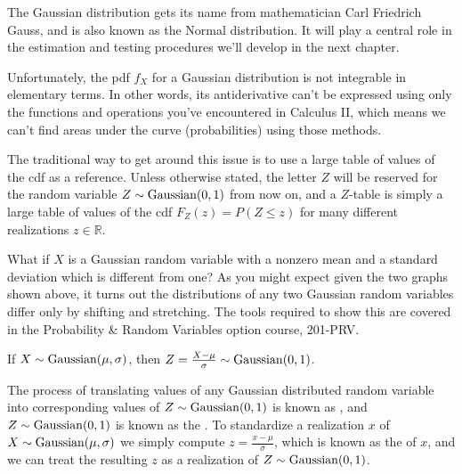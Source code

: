 The Gaussian distribution gets its name from mathematician Carl Friedrich Gauss, and is also known as the Normal distribution. It will play a central role in the estimation and testing procedures we'll develop in the next chapter. 

Unfortunately, the pdf $f_X$ for a Gaussian distribution is not integrable in elementary terms. In other words, its antiderivative can't be expressed using only the functions and operations you've encountered in Calculus II, which means we can't find areas under the curve (probabilities) using those methods.

The traditional way to get around this issue is to use a large table of values of the cdf as a reference. Unless otherwise stated, the letter $Z$ will be reserved for the random variable $Z \sim \operatorname{Gaussian}(0,1)$ from now on, and a $Z$-table is simply a large table of values of the cdf $F_Z(z) = P(Z \leq z)$ for many different realizations $z \in \mathbb{R}$.

What if $X$ is a Gaussian random variable with a nonzero mean and a standard deviation which is different from one? As you might expect given the two graphs shown above, it turns out the distributions of any two Gaussian random variables differ only by shifting and stretching. The tools required to show this are covered in the Probability \& Random Variables option course, 201-PRV.

\begin{proposition}If $X \sim \operatorname{Gaussian} (\mu,\sigma)$, then $Z = \frac{X - \mu}{\sigma} \sim \operatorname{Gaussian}(0,1)$.
\end{proposition}

The process of translating values of any Gaussian distributed random variable into corresponding values of $Z \sim \operatorname{Gaussian} (0,1)$ is known as , and $Z \sim \operatorname{Gaussian} (0,1)$ is known as the . To standardize a realization $x$ of $X \sim \operatorname{Gaussian}(\mu, \sigma)$ we simply compute $z  = \frac{x - \mu}{\sigma}$, which is known as the  of $x$, and we can treat the resulting $z$ as a realization of $Z \sim \operatorname{Gaussian}(0, 1)$.


